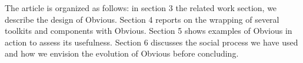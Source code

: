 \begin{comment}
A typical scenario of Obvious would be the design of
VizTree~\cite{lin01}, a VA application for monitoring
massive time-series.  VizTree encodes very long time-series of a
continuous value as a suffix tree; the details of this encoding being
beyond the scope of the paragraph scenario.  The associated tree
visualization has been implemented by specialists of data-mining and
leaves room for improvements in term of visualization and
interaction.  Using Obvious, the authors would first connect their
computed data structure to the data model of Obvious. There are two
ways of doing that: use the Obvious data-model directly or use the
native data-model implemented for mining the time-series and wrap it
with an implementation of the Obvious data-model. Both are possible
and will be chosen according to the amount of work and flexibility
offered by one option or the other. Once an Obvious data-model is
available, the authors of VisTree can start exploring which toolkit
will provide them the best support for their visualization. They can
choose among the InfoVis Toolkit, Prefuse and JUNG to visualize tree
data. Once the best one has been chosen, the interaction can be
crafted either on top of the abstraction provided by Obvious - to keep
the option of switching the final implementation - or using the native
toolkit controls to keep a tighter control of the interface. If
desired, the interface can also be improved by adding other
visualizations associated with the computation of the prefix tree or
of statistics associated with the data. If multiple-coordinated views
are required for that, Improvise visualization and views can be added
to the interface using the same data model. In that scenario, Obvious
has enabled data-mining researchers to focus on their skills and to
use state-of-the-art visualization components at a later stage of the
development of their application.

Another scenario [DDupe]

Yet another, more futuristic scenario: porting a new visualization type to multiple toolkits
or allowing cross-toolkit brushing interaction.

\end{comment}

The article is organized as follows: in section 3 the related work section,
we describe the design of Obvious. Section 4 reports on the wrapping
of several toolkits and components with Obvious. Section 5 shows
examples of Obvious in action to assess its usefulness. Section 6
discusses the social process we have used and how we envision the
evolution of Obvious before concluding.
